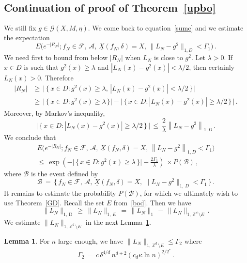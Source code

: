 \documentclass[10pt]{amsart}
\theoremstyle{definition}\newtheorem{defi}[theo]{Definition}\newtheorem{rema}[theo]{Remark}\newtheorem{exam}[theo]{Example}\newtheorem{exem}[theo]{Example}\newtheorem{nota}[theo]{Notation}
\newcommand{\XX}{{\underline{X}}}
\newcommand*\tD{\mathrm{D}}%
\newcommand*\Zd {{\mathbb Z^d}}
\newcommand{\cA}{\mathcal{A}}
\newcommand{\cB}{\mathcal{B}}
\newcommand{\cF}{\mathcal{F}}
\newcommand{\cG}{\mathcal{G}}
\newtheorem{lemma}[theo]{Lemma}
\begin{document}
\subsection{Continuation of proof of Theorem~\ref{upbo}}\label{contin}
We still fix ${g\in \cG(X,M,\eta)}$. We come back to equation~\eqref{sumc} and we estimate the expectation
\[
E\big(e^{-|R_N|};f_N\in\cF,\,\cA,\,\XX(f_N,\delta)=X,
\,\|L_N-g^2\|_{1,D}<\Gamma_1\big)\,.
\]
We need first to bound from below $|R_N|$ when $L_N$ is close to $g^2$. Let $\lambda>0$. If $x\in D$ is such that $g^2(x)\geq\lambda$ and $|L_N(x)-g^2(x)|<\lambda/2$, then certainly $L_N(x)>0$. Therefore
\begin{equation}
\begin{aligned}
|R_N| &\geq\,\big|\,\big\{\,x\in D:g^2(x)\geq\lambda,\, \left|L_N(x)-g^2(x)\right|<\lambda/2\,\big\}\,\big|\\
&\geq\,
\big|\,\big\{\,x\in D:g^2(x)\geq\lambda\,\big\}\big|-
\big|\,\big\{\,x\in D: \left|L_N(x)-g^2(x)\right|\geq\lambda/2\,\big\}\,\big|\,. \label{RNtriv}
\end{aligned}
\end{equation}
Moreover, by Markov's inequality,
\[
\big|\,\big\{\,x\in D:
\left|L_N(x)-g^2(x)\right|\geq\lambda/2\,\big\}\,\big|\,\leq\,
\frac{2}{\lambda}\left\|L_N-g^2\right\|_{1,D}\,.
\]
We conclude that
\begin{multline}\label{imc}
E\big(e^{-|R_N|};f_N\in\cF,\,\cA,\,\XX(f_N,\delta)=X,
\,\left\|L_N-g^2\right\|_{1,D}<\Gamma_1\big)
\\
\leq\,\exp\left(-
\big|\,\big\{\,x\in D:g^2(x)\geq\lambda\,\big\}\big| +\frac{2\Gamma_1}{\lambda}
\right)\,\times P(\cB)\,,
\end{multline}
where $\cB$ is the event defined by
\begin{equation}\label{E:cB}
\cB\,=\,\Big\{\, f_N\in\cF,\,\cA,\,\XX(f_N,\delta)=X,
\,\|L_N-g^2\|_{1,\,D}<\Gamma_1\,\Big\}
\,.
\end{equation}
It remains to estimate the probability $P(\cB)$, for which we ultimately wish to use Theorem~\ref{GD}. Recall the set $E$ from~\eqref{bod}. Then we have
\begin{equation}\label{prel}
\|L_N\|_{1,\,\tD}\,\geq\, \|L_N\|_{1,\,E}\,=\, \|L_N\|_{1}\,-\, \|L_N\|_{1,\,\Zd\,\setminus E}\,.
\end{equation}
We estimate $\|L_N\|_{1,\,\Zd\,\setminus E}$ in the next Lemma~\ref{exte}.
\begin{lemma}\label{exte}
For $n$ large enough, we have $\|L_N\|_{1,\,\Zd\,\setminus E}\leq\Gamma_2$ where
\begin{equation*}
\Gamma_2
\,=\,c\,\delta^{4/d}\, n^{d+2} (c_d{\kappa}\ln n)^{2/2^*}\,.
\end{equation*}
\end{lemma}
\end{document}
